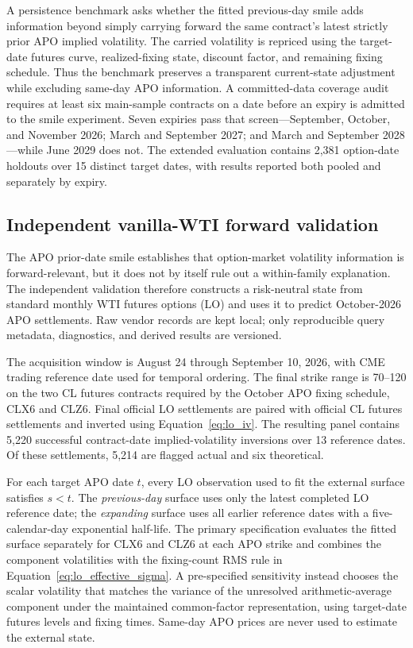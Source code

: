 A persistence benchmark asks whether the fitted previous-day smile adds information beyond simply carrying forward the same contract's latest strictly prior APO implied volatility. The carried volatility is repriced using the target-date futures curve, realized-fixing state, discount factor, and remaining fixing schedule. Thus the benchmark preserves a transparent current-state adjustment while excluding same-day APO information. A committed-data coverage audit requires at least six main-sample contracts on a date before an expiry is admitted to the smile experiment. Seven expiries pass that screen---September, October, and November 2026; March and September 2027; and March and September 2028---while June 2029 does not. The extended evaluation contains 2,381 option-date holdouts over 15 distinct target dates, with results reported both pooled and separately by expiry.

\subsection{Independent vanilla-WTI forward validation}\label{sec:external_lo_design}

The APO prior-date smile establishes that option-market volatility information is forward-relevant, but it does not by itself rule out a within-family explanation. The independent validation therefore constructs a risk-neutral state from standard monthly WTI futures options (LO) and uses it to predict October-2026 APO settlements. Raw vendor records are kept local; only reproducible query metadata, diagnostics, and derived results are versioned.

The acquisition window is August 24 through September 10, 2026, with CME trading reference date used for temporal ordering. The final strike range is 70--120 on the two CL futures contracts required by the October APO fixing schedule, CLX6 and CLZ6. Final official LO settlements are paired with official CL futures settlements and inverted using Equation~\eqref{eq:lo_iv}. The resulting panel contains 5,220 successful contract-date implied-volatility inversions over 13 reference dates. Of these settlements, 5,214 are flagged actual and six theoretical.

For each target APO date $t$, every LO observation used to fit the external surface satisfies $s<t$. The \emph{previous-day} surface uses only the latest completed LO reference date; the \emph{expanding} surface uses all earlier reference dates with a five-calendar-day exponential half-life. The primary specification evaluates the fitted surface separately for CLX6 and CLZ6 at each APO strike and combines the component volatilities with the fixing-count RMS rule in Equation~\eqref{eq:lo_effective_sigma}. A pre-specified sensitivity instead chooses the scalar volatility that matches the variance of the unresolved arithmetic-average component under the maintained common-factor representation, using target-date futures levels and fixing times. Same-day APO prices are never used to estimate the external state.

